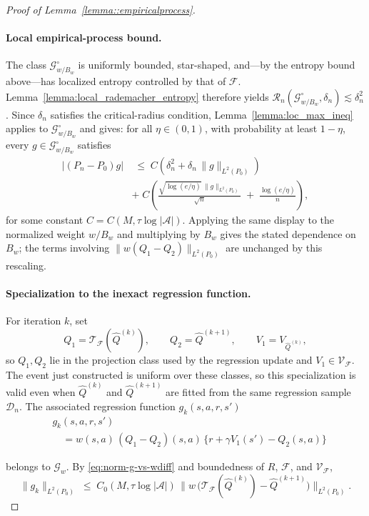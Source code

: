 \documentclass{article}
\theoremstyle{plain}
\theoremstyle{definition}
\theoremstyle{remark}
\begin{document}
\begin{proof}[Proof of Lemma~\ref{lemma::empiricalprocess}]
\paragraph{Local empirical-process bound.}
The class $\mathcal G_{w/B_w}^\circ$ is uniformly bounded, star-shaped,
and---by the entropy bound above---has localized entropy controlled by that
of $\mathcal F$.
Lemma~\ref{lemma:local_rademacher_entropy} therefore yields
$\mathcal{R}_n(\mathcal G_{w/B_w}^\circ,\delta_n)\lesssim\delta_n^2$.
Since $\delta_n$ satisfies the critical-radius condition,
Lemma~\ref{lemma:loc_max_ineq} applies to $\mathcal G_{w/B_w}^\circ$ and gives:
for all $\eta\in(0,1)$, with probability at least $1-\eta$, every
$g\in\mathcal G_{w/B_w}^\circ$ satisfies
\begin{align*}
|(P_n - P_0)g|
&\;\le\;
C\!\left(
    \delta_n^2
    + \delta_n\,\|g\|_{L^2(P_0)}
\right)
\\[0.4em]
&+\;
C\!\left(
    \frac{
      \sqrt{\log(e/\eta)}\,\|g\|_{L^2(P_0)}
    }{\sqrt n}
    \;+\;
    \frac{\log(e/\eta)}{n}
\right),
\end{align*}
for some constant \(C=C(M,\tau\log|\mathcal A|)\). Applying the same
display to the normalized weight \(w/B_w\) and multiplying by \(B_w\) gives
the stated dependence on \(B_w\); the terms involving
\(\|w(Q_1-Q_2)\|_{L^2(P_0)}\) are unchanged by this rescaling.

\paragraph{Specialization to the inexact regression function.}
For iteration $k$, set
\[
Q_1=\mathcal{T}_{\mathcal{F}}(\widehat Q^{(k)}),\qquad
Q_2=\widehat Q^{(k+1)},\qquad
V_1=V_{\widehat Q^{(k)}},
\]
so $Q_1,Q_2$ lie in the projection class used by the regression update and
$V_1\in\mathcal V_{\mathcal F}$.
The event just constructed is uniform over these classes, so this specialization
is valid even when \(\widehat Q^{(k)}\) and \(\widehat Q^{(k+1)}\) are fitted
from the same regression sample \(\mathcal D_n\).
The associated regression function $g_k(s,a,r,s')$
\begin{align*}
&  g_k(s,a,r,s')\\
&\quad =
w(s,a)\,(Q_1-Q_2)(s,a)\,
\bigl\{r+\gamma V_1(s')-Q_2(s,a)\bigr\}
\end{align*}

belongs to $\mathcal{G}_w$.
By \eqref{eq:norm-g-vs-wdiff} and boundedness of $R$, $\mathcal F$, and
$\mathcal V_{\mathcal F}$,
\[
\|g_k\|_{L^2(P_0)}
\;\le\;
C_0(M,\tau\log|\mathcal A|)\,
\bigl\|
w\,
\bigl(
\mathcal{T}_{\mathcal{F}}(\widehat Q^{(k)})
-\widehat Q^{(k+1)}
\bigr)
\bigr\|_{L^2(P_0)}.
\]


\end{proof}
\end{document}
